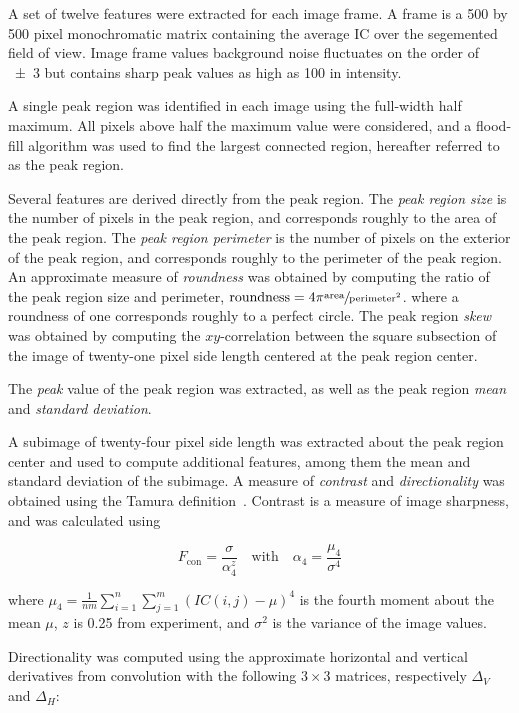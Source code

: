 \documentclass[10pt]{article}
\begin{document}
A set of twelve features were extracted for each image frame.
A frame is a \num{500} by \num{500} pixel monochromatic matrix containing the average IC over the segemented field of view. 
Image frame values background noise fluctuates on the order of \num{+-3} but contains sharp peak values as high as \num{100} in intensity.

A single peak region was identified in each image using the full-width half maximum.
All pixels above half the maximum value were considered, and a flood-fill algorithm was used to find the largest connected region, hereafter referred to as the peak region.

Several features are derived directly from the peak region.
The \emph{peak region size} is the number of pixels in the peak region, and corresponds roughly to the area of the peak region.
The \emph{peak region perimeter} is the number of pixels on the exterior of the peak region, and corresponds roughly to the perimeter of the peak region.
An approximate measure of \emph{roundness} was obtained by computing the ratio of the peak region size and perimeter, $\text{roundness} = 4\pi \sfrac{\text{area}}{\text{perimeter}^2}$.
where a roundness of one corresponds roughly to a perfect circle.
The peak region \emph{skew} was obtained by computing the $xy$-correlation between the square subsection of the image of twenty-one pixel side length centered at the peak region center.

The \emph{peak} value of the peak region was extracted, as well as the peak region \emph{mean} and \emph{standard deviation}.

A subimage of twenty-four pixel side length was extracted about the peak region center and used to compute additional features, among them the mean and standard deviation of the subimage.
A measure of \emph{contrast} and \emph{directionality} was obtained using the Tamura definition~\cite{Tamura1978}.
Contrast is a measure of image sharpness, and was calculated using

$$
F_\text{con} = \frac{\sigma}{\alpha_4^z} \quad \text{with} \quad \alpha_4 = \frac{\mu_4}{\sigma^4}
$$

\noindent
where $\mu_4 = \frac{1}{nm} \sum_{i=1}^n \sum_{j=1}^m (IC(i,j)-\mu)^4$
is the fourth moment about the mean $\mu$, $z$ is \num{0.25} from experiment, and $\sigma^2$ is the variance of the image values.

Directionality was computed using the approximate horizontal and vertical derivatives from convolution with the following $3\times3$ matrices, respectively $\Delta_V$ and $\Delta_H$:
\end{document}
